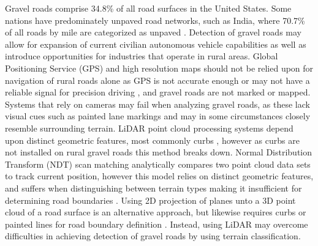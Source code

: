 \documentclass[journal,onecolumn]{IEEEtran}
\begin{document}
	{Gravel roads comprise 34.8\% \cite{road_stats_2} of all road surfaces in the United States. Some nations have predominately unpaved road networks, such as India, where 70.7\% of all roads by mile are categorized as unpaved \cite{malik_lal_2019}. Detection of gravel roads may allow for expansion of current civilian autonomous vehicle capabilities as well as introduce opportunities for industries that operate in rural areas. Global Positioning Service (GPS) and high resolution maps should not be relied upon for navigation of rural roads alone as GPS is not accurate enough or may not have a reliable signal for precision driving \cite{noauthor_gpsgov_nodate}, and gravel roads are not marked or mapped. Systems that rely on cameras may fail when analyzing gravel roads, as these lack visual cues such as painted lane markings \cite{crisman_scarf_1993} and may in some circumstances closely resemble surrounding terrain. LiDAR point cloud processing systems depend upon distinct geometric features, most commonly curbs \cite{yadav_extraction_2017,liu_new_2013,qiu_fast_2016,fernandes_road_2014,seker_experiments_nodate,yang_semi-automated_2013,miyazaki_line-based_2014,hervieu_road_2013,smadja_road_nodate}, however as curbs are not installed on rural gravel roads \cite{skorseth_gravel_nodate} this method breaks down. Normal Distribution Transform (NDT) scan matching analytically compares two point cloud data sets to track current position, however this model relies on distinct geometric features, and suffers when distinguishing between terrain types making it insufficient for determining road boundaries \cite{biber_normal_2003}. Using 2D projection of planes unto a 3D point cloud of a road surface is an alternative approach, but likewise requires curbs or painted lines for road boundary definition \cite{fernandes_road_2014, borkar_robust_2009-1, guo_lane_2015}. Instead, using LiDAR may overcome difficulties in achieving detection of gravel roads by using terrain classification.}
	
\end{document}

